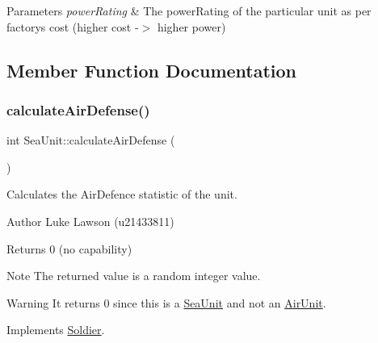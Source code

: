 \begin{DoxyParams}{Parameters}
{\em power\+Rating} & The power\+Rating of the particular unit as per factory\textquotesingle{}s cost (higher cost -\/$>$ higher power) \\
\hline
\end{DoxyParams}


\subsection{Member Function Documentation}
\mbox{\label{class_sea_unit_ab05ac5cd7be62a139c16f36146c17b00}} 
\subsubsection{\texorpdfstring{calculateAirDefense()}{calculateAirDefense()}}
{\footnotesize\ttfamily int Sea\+Unit\+::calculate\+Air\+Defense (\begin{DoxyParamCaption}{ }\end{DoxyParamCaption})\hspace{0.3cm}{\ttfamily [virtual]}}



Calculates the Air\+Defence statistic of the unit. 

\begin{DoxyAuthor}{Author}
Luke Lawson (u21433811) 
\end{DoxyAuthor}
\begin{DoxyReturn}{Returns}
0 (no capability) 
\end{DoxyReturn}
\begin{DoxyNote}{Note}
The returned value is a random integer value. 
\end{DoxyNote}
\begin{DoxyWarning}{Warning}
It returns 0 since this is a \mbox{\hyperlink{class_sea_unit}{Sea\+Unit}} and not an \mbox{\hyperlink{class_air_unit}{Air\+Unit}}. 
\end{DoxyWarning}


Implements \mbox{\hyperlink{class_soldier_a3dc2d7a06621380c4561d330d5359dc2}{Soldier}}.

\mbox{\label{class_sea_unit_aa2d92acd5e3798fdddfa860d5a9d346b}} 
